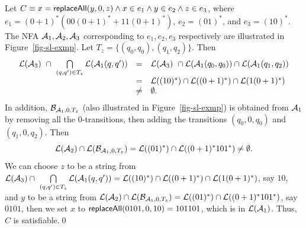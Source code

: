 \begin{example}\label{exmp-sl}
Let $C \equiv x= \mathsf{replaceAll}(y, 0, z) \wedge x \in e_1 \wedge y \in e_2 \wedge z \in e_3$, where $e_1=(0+1)^* (00(0+1)^* + 11(0+1)^*)$,  $e_2= (01)^*$,  and $e_3 = (10)^*$. The NFA $\mathcal{A}_{1}, \mathcal{A}_{2}, \mathcal{A}_{3}$ corresponding to $e_1, e_2, e_3$ respectively are illustrated in Figure~\ref{fig-sl-exmp}. Let $T_z = \{(q_0, q_0), (q_1, q_2)\}$.  Then
$$
\begin{array}{l c l}
 \mathcal{L}(\mathcal{A}_3)\ \cap\ \bigcap \limits_{(q, q') \in T_z} \mathcal{L}(\mathcal{A}_1(q, q'))  & = & \mathcal{L}(\mathcal{A}_3)\ \cap \mathcal{L}(\mathcal{A}_1(q_0, q_0)) \cap \mathcal{L}(\mathcal{A}_1(q_1,q_2)) \\
& = & \mathcal{L}((10)^*) \cap \mathcal{L}((0+1)^*) \cap \mathcal{L}(1(0+1)^*) \\
& \neq & \emptyset.
\end{array}
$$
In addition, $\mathcal{B}_{\mathcal{A}_1, 0, T_z}$ (also illustrated in Figure~\ref{fig-sl-exmp}) is obtained from $\mathcal{A}_1$ by removing all the $0$-transitions, then adding the transitions $(q_0, 0, q_0)$ and $(q_1, 0, q_2)$. Then
$$
 \mathcal{L}(\mathcal{A}_2) \cap \mathcal{L}(\mathcal{B}_{\mathcal{A}_1,0,T_z})   =  \mathcal{L}((01)^*) \cap \mathcal{L}((0+1)^* 10 1^*) \neq \emptyset.
$$
We can choose $z$ to be a string from $\mathcal{L}(\mathcal{A}_3) \cap \ \bigcap \limits_{(q, q') \in T_z} \mathcal{L}(\mathcal{A}_1(q, q'))=\mathcal{L}((10)^*) \cap \mathcal{L}((0+1)^*) \cap \mathcal{L}(1(0+1)^*)$, say $10$, and $y$ to be a string from $ \mathcal{L}(\mathcal{A}_2) \cap \mathcal{L}(\mathcal{B}_{\mathcal{A}_1,0,T_z})   =  \mathcal{L}((01)^*) \cap \mathcal{L}((0+1)^* 10 1^*)$, say $0101$,  then we set $x$ to $\mathsf{replaceAll}(0101, 0, 10)=101101$, which is in $\mathcal{L}(\mathcal{A}_1)$. Thus, $C$ is satisfiable.\qed
%
\begin{figure}[htbp]
\begin{center}

\end{center}
\end{figure}
\end{example}
